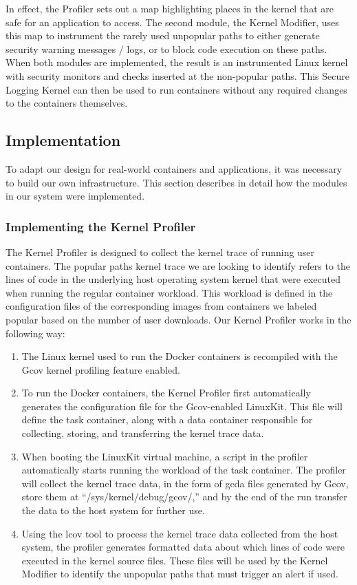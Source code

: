 In effect, the Profiler sets out a map highlighting places in the kernel that are safe for an application to access. 
The second module, the Kernel Modifier,  uses this map to instrument the rarely used unpopular paths to either generate security warning messages / logs, or to block code execution on these paths. 
When both modules are implemented, the result is an instrumented Linux kernel with security monitors and checks inserted at the non-popular paths. 
This Secure Logging Kernel can then be used to run containers without any required changes to the containers themselves.

\subsection{Implementation}
\label{sec.design.implementation}
To adapt our design for real-world containers  and applications, it was necessary to build our own infrastructure. This section describes in detail how the modules in our system were implemented.

\subsubsection{Implementing the Kernel Profiler}
\label{sec.design.implementation.kernel_profiler}
The Kernel Profiler is designed to collect the kernel trace of running user containers. 
The popular paths kernel trace we are looking to identify refers to the lines of code in the underlying host operating system kernel that were executed when running the regular container workload. 
This workload is defined in the configuration files of the corresponding images from containers we labeled popular based on the number of user downloads. 
Our Kernel Profiler works in the following way: 
\begin{enumerate}
	\item The Linux kernel used to run the Docker containers is recompiled with the Gcov \cite{gcov} kernel profiling feature enabled. 
	\item To run the Docker containers, the Kernel Profiler first automatically generates the configuration file for the Gcov-enabled LinuxKit. 
	This file will define the task container, along with a data container responsible for collecting, storing, and transferring the kernel trace data. 
	\item When booting the LinuxKit virtual machine, a script in the profiler automatically starts running the workload of the task container. 
	The profiler will collect the kernel trace data, in the form of gcda files generated by Gcov, store them at ``/sys/kernel/debug/gcov/,'' 
	and by the end of the run transfer the data to the host system for further use. 
	\item Using the lcov \cite{lcov} tool to process the kernel trace data collected from the host system, the profiler generates formatted data about which lines of code were executed in the kernel source files. 
	These files will be used by the  Kernel Modifier to identify the unpopular paths that must trigger an alert if used. 
\end{enumerate}

